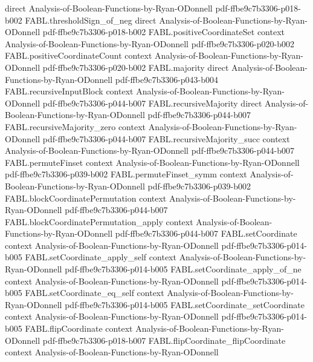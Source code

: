 \begin{theorem}
  {direct}
  {Analysis-of-Boolean-Functions-by-Ryan-ODonnell}
  {pdf-ffbe9c7b3306-p018-b002}
\proofstep
  {FABL.thresholdSign_of_neg}
  {direct}
  {Analysis-of-Boolean-Functions-by-Ryan-ODonnell}
  {pdf-ffbe9c7b3306-p018-b002}
\proofstep
  {FABL.positiveCoordinateSet}
  {context}
  {Analysis-of-Boolean-Functions-by-Ryan-ODonnell}
  {pdf-ffbe9c7b3306-p020-b002}
\proofstep
  {FABL.positiveCoordinateCount}
  {context}
  {Analysis-of-Boolean-Functions-by-Ryan-ODonnell}
  {pdf-ffbe9c7b3306-p020-b002}
\proofstep
  {FABL.majority}
  {direct}
  {Analysis-of-Boolean-Functions-by-Ryan-ODonnell}
  {pdf-ffbe9c7b3306-p043-b004}
\proofstep
  {FABL.recursiveInputBlock}
  {context}
  {Analysis-of-Boolean-Functions-by-Ryan-ODonnell}
  {pdf-ffbe9c7b3306-p044-b007}
\proofstep
  {FABL.recursiveMajority}
  {direct}
  {Analysis-of-Boolean-Functions-by-Ryan-ODonnell}
  {pdf-ffbe9c7b3306-p044-b007}
\proofstep
  {FABL.recursiveMajority_zero}
  {context}
  {Analysis-of-Boolean-Functions-by-Ryan-ODonnell}
  {pdf-ffbe9c7b3306-p044-b007}
\proofstep
  {FABL.recursiveMajority_succ}
  {context}
  {Analysis-of-Boolean-Functions-by-Ryan-ODonnell}
  {pdf-ffbe9c7b3306-p044-b007}
\proofstep
  {FABL.permuteFinset}
  {context}
  {Analysis-of-Boolean-Functions-by-Ryan-ODonnell}
  {pdf-ffbe9c7b3306-p039-b002}
\proofstep
  {FABL.permuteFinset_symm}
  {context}
  {Analysis-of-Boolean-Functions-by-Ryan-ODonnell}
  {pdf-ffbe9c7b3306-p039-b002}
\proofstep
  {FABL.blockCoordinatePermutation}
  {context}
  {Analysis-of-Boolean-Functions-by-Ryan-ODonnell}
  {pdf-ffbe9c7b3306-p044-b007}
\proofstep
  {FABL.blockCoordinatePermutation_apply}
  {context}
  {Analysis-of-Boolean-Functions-by-Ryan-ODonnell}
  {pdf-ffbe9c7b3306-p044-b007}
\proofstep
  {FABL.setCoordinate}
  {context}
  {Analysis-of-Boolean-Functions-by-Ryan-ODonnell}
  {pdf-ffbe9c7b3306-p014-b005}
\proofstep
  {FABL.setCoordinate_apply_self}
  {context}
  {Analysis-of-Boolean-Functions-by-Ryan-ODonnell}
  {pdf-ffbe9c7b3306-p014-b005}
\proofstep
  {FABL.setCoordinate_apply_of_ne}
  {context}
  {Analysis-of-Boolean-Functions-by-Ryan-ODonnell}
  {pdf-ffbe9c7b3306-p014-b005}
\proofstep
  {FABL.setCoordinate_eq_self}
  {context}
  {Analysis-of-Boolean-Functions-by-Ryan-ODonnell}
  {pdf-ffbe9c7b3306-p014-b005}
\proofstep
  {FABL.setCoordinate_setCoordinate}
  {context}
  {Analysis-of-Boolean-Functions-by-Ryan-ODonnell}
  {pdf-ffbe9c7b3306-p014-b005}
\proofstep
  {FABL.flipCoordinate}
  {context}
  {Analysis-of-Boolean-Functions-by-Ryan-ODonnell}
  {pdf-ffbe9c7b3306-p018-b007}
\proofstep
  {FABL.flipCoordinate_flipCoordinate}
  {context}
  {Analysis-of-Boolean-Functions-by-Ryan-ODonnell}

\end{theorem}
